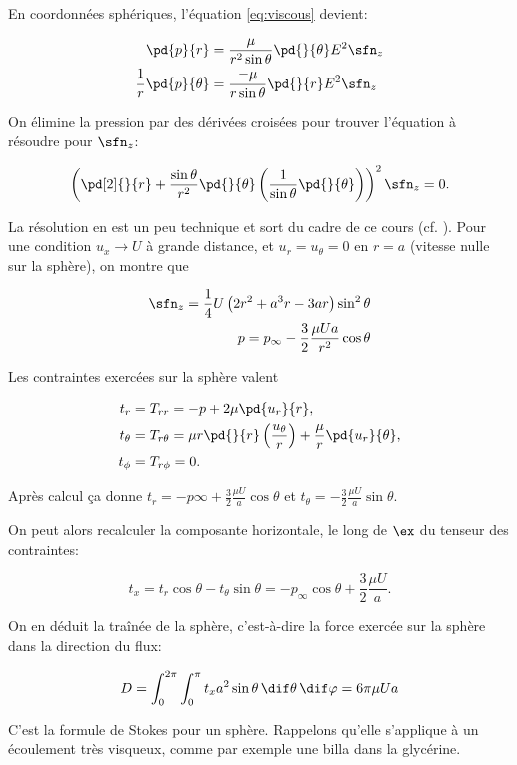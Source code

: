 En coordonnées sphériques, l'équation \ref{eq:viscous} devient:

\begin{align*}
  \pd{p}{r} &= \frac{\mu}{r^2\sin\theta}\pd{}{\theta}E^2\sfn_z \\
  \frac{1}{r}\pd{p}{\theta} &= \frac{-\mu}{r\sin\theta}\pd{}{r}E^2\sfn_z \\
\end{align*}

On élimine la pression par des dérivées croisées pour trouver l'équation à résoudre pour $\sfn_z$: 

\begin{equation}
  \left(\pd[2]{}{r} + \frac{\sin\theta}{r^2}\pd{}{\theta}\left(\frac{1}{\sin\theta}\pd{}{\theta}\right) \right)^2 \sfn_z = 0. 
  \label{eq:stokes_equation_sphere}
\end{equation}

La résolution en est un peu technique et sort du cadre de ce cours (cf. \cite[p. 225]{acheson01aa}). Pour une condition $u_x \rightarrow U$ à grande distance, et $u_r = u_\theta = 0$ en $r=a$ (vitesse nulle sur la sphère), on montre que 

\begin{align}
  \sfn_z = \frac{1}{4}U\left( 2r^2 + {a^3}{r} - 3 ar\right) \sin^2\theta \label{eq:sol_psi} \\
  p = p_\infty - \frac{3}{2} \frac{\mu U a}{r^2} \cos\theta 
\end{align}

Les contraintes exercées sur la sphère valent

\begin{align*}
  t_r &= T_{rr} = - p + 2\mu \pd{u_r}{r}, \\
t_\theta &= T_{r\theta} = \mu r \pd{}{r}\left(\frac{u_\theta}{r}\right) + \frac{\mu}{r}\pd{u_r}{\theta}, \\
t_\phi &= T_{r\phi} = 0. 
\end{align*}

Après calcul ça donne 
$t_r = -p\infty + \frac{3}{2}\frac{\mu U}{a}\cos\theta$ et 
$t_\theta = - \frac{3}{2}\frac{\mu U}{a}\sin\theta$. 

On peut alors recalculer la composante horizontale, le long de $\ex$ du tenseur des contraintes: 

\begin{displaymath}
  t_x = t_r \cos\theta - t_\theta \sin\theta = -p_\infty \cos\theta + \frac{3}{2}\frac{\mu U}{a}. 
\end{displaymath}

On en déduit la traînée de la sphère, c'est-à-dire la force exercée sur la sphère dans la direction du flux: 

\begin{equation}
  D = \int_0^{2\pi}\int_{0}^{\pi} t_x a^2 \sin\theta\, \dif \theta\, \dif\varphi = 6\pi \mu U a
  \label{eq:stokes_sphere}
\end{equation}

C'est la formule de Stokes pour un sphère. Rappelons qu'elle s'applique à un écoulement très visqueux, comme par exemple une billa dans la glycérine. 




